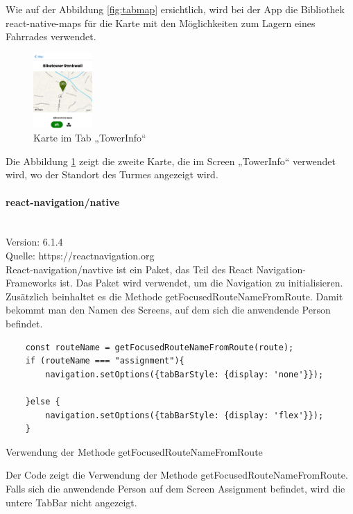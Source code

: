 \noindent Wie auf der Abbildung \ref{fig:tabmap} ersichtlich, wird bei der App die Bibliothek react-native-maps für die Karte mit den Möglichkeiten zum Lagern eines Fahrrades verwendet.

\begin{figure}[H]
  \centering
  \includegraphics[width=0.2\textwidth]{images/app-screenshots/smallmap.png}
  \caption{Karte im Tab „TowerInfo“}
  \label{fig:smallmap}
\end{figure}

\noindent Die Abbildung \ref{fig:smallmap} zeigt die zweite Karte, die im Screen „TowerInfo“ verwendet wird, wo der Standort des Turmes angezeigt wird.

\bigskip

\paragraph{react-navigation/native}\mbox{}\\
Version: 6.1.4\\
Quelle: https://reactnavigation.org\\
React-navigation/navtive ist ein Paket, das Teil des React Navigation-\Gls{Framework}s ist. Das Paket wird verwendet, um die Navigation zu initialisieren. Zusätzlich beinhaltet es die Methode getFocusedRouteNameFromRoute. Damit bekommt man den Namen des Screens, auf dem sich die anwendende Person befindet.

\begin{listing}[H]
  \begin{verbatim}
    const routeName = getFocusedRouteNameFromRoute(route);
    if (routeName === "assignment"){
        navigation.setOptions({tabBarStyle: {display: 'none'}});
        
    }else {
        navigation.setOptions({tabBarStyle: {display: 'flex'}});
    }
\end{verbatim}
  \caption{Verwendung der Methode getFocusedRouteNameFromRoute}
  \label{lst:getfocusedroutename}
\end{listing}

\noindent Der Code zeigt die Verwendung der Methode getFocusedRouteNameFromRoute. Falls sich die anwendende Person auf dem Screen Assignment befindet, wird die untere TabBar nicht angezeigt.

